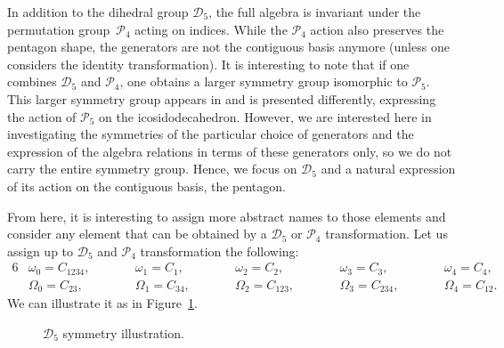 \documentclass[10pt,a4paper]{amsart}
\numberwithin{equation}{section}
\begin{document}
In addition to the dihedral group $\mathcal{D}_5$, the full algebra is invariant under the permutation group~$\mathcal{P}_4$ acting on indices. While the $\mathcal{P}_4$ action also preserves the pentagon shape, the generators are not the contiguous basis anymore (unless one considers the identity transformation). It is interesting to note that if one combines $\mathcal{D}_5$ and $\mathcal{P}_4$, one obtains a larger symmetry group isomorphic to $\mathcal{P}_5$. This larger symmetry group appears in \cite{Crampe2023} and is presented differently, expressing the action of $\mathcal{P}_5$ on the icosidodecahedron. However, we are interested here in investigating the symmetries of the particular choice of generators and the expression of the algebra relations in terms of these generators only, so we do not carry the entire symmetry group. Hence, we focus on $\mathcal{D}_5$ and a natural expression of its action on the contiguous basis, the pentagon. %

From here, it is interesting to assign more abstract names to those elements and consider any element that can be obtained by a $\mathcal{D}_5$ or $\mathcal{P}_4$ transformation. Let us assign up to $\mathcal{D}_5$ and $\mathcal{P}_4$ transformation the following:
\begin{alignat*}{6}
&\omega_0=C_{1234},  \qquad&&\omega_1=C_1,\qquad&&\omega_2=C_2,\qquad&&\omega_3=C_3,\qquad&&\omega_4=C_4,&\\
& \Omega_0=C_{23}, \qquad&&
  \Omega_1=C_{34}, \qquad&&
  \Omega_2=C_{123}, \qquad&&
  \Omega_3=C_{234}, \qquad&&
  \Omega_4=C_{12}.&
\end{alignat*}
We can illustrate it as in Figure~\ref{fig:pentagon}.

\begin{figure}[t]
\centering
{}
\caption{$\mathcal{D}_5$ symmetry illustration.}
\label{fig:pentagon}
\end{figure}
\end{document}

